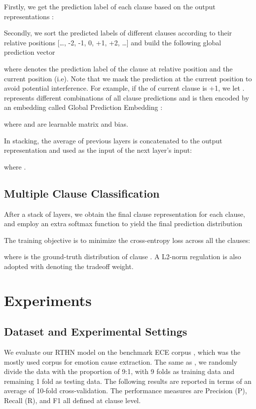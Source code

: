 \documentclass{article}
\begin{document}
Firstly, we get the prediction label of each clause  based on the output representations :


Secondly, we sort the predicted labels of different clauses according to their relative positions […, -2, -1, 0, +1, +2, …] and build the following global prediction vector

where  denotes the prediction label of the clause at relative position  and the current position (i.e). Note that we mask the prediction at the current position to avoid potential interference. For example, if the  of current clause is +1, we let .  represents different combinations of all clause predictions and is then encoded by an embedding called Global Prediction Embedding :

where  and  are learnable matrix and bias.

In stacking, the average  of previous layers is concatenated to the output representation  and used as the input of the next layer’s input:

where .

\subsection{Multiple Clause Classification}
After a stack of  layers, we obtain the final clause representation  for each clause, and employ an extra softmax function to yield the final prediction distribution


The training objective is to minimize the cross-entropy loss across all the clauses:

where  is the ground-truth distribution of clause . A L2-norm regulation is also adopted with  denoting the tradeoff weight.

\section{Experiments}
\subsection{Dataset and Experimental Settings}
We evaluate our RTHN model on the benchmark ECE corpus \cite{gui2016event}, which was the mostly used corpus for emotion cause extraction. The same as \cite{gui2017question}, we randomly divide the data with the proportion of 9:1, with 9 folds as training data and remaining 1 fold as testing data. The following results are reported in terms of an average of 10-fold cross-validation. The performance measures are Precision (P), Recall (R), and F1 all defined at clause level.
\end{document}
